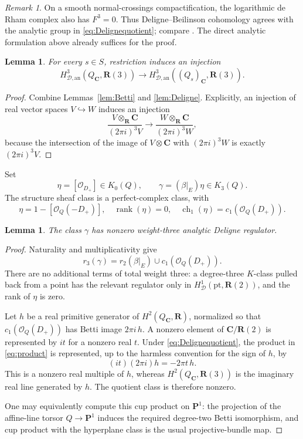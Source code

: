 \documentclass[11pt,a4paper]{article}
\newtheorem{lemma}[theorem]{Lemma}
\theoremstyle{remark}
\newtheorem{remark}[theorem]{Remark}
\newcommand{\R}{\mathbf R}
\newcommand{\C}{\mathbf C}
\newcommand{\PP}{\mathbf P}
\newcommand{\OO}{\mathcal O}
\newcommand{\HD}{H_{\mathcal D,\mathrm{an}}}
\begin{document}
\begin{remark}
On a smooth normal-crossings compactification, the logarithmic de Rham complex also has $F^3=0$. Thus Deligne--Beilinson cohomology agrees with the analytic group in \eqref{eq:Delignequotient}; compare \cite[Remark~2.13]{EsnaultViehweg}. The direct analytic formulation above already suffices for the proof.
\end{remark}

\begin{lemma}\label{lem:Deligneinject}
For every $s\in S$, restriction induces an injection
\[
\HD^3(Q_{\C},\R(3))\longrightarrow\HD^3((Q_s)_{\C},\R(3)).
\]
\end{lemma}
\begin{proof}
Combine Lemmas~\ref{lem:Betti} and \ref{lem:Deligne}. Explicitly, an injection of real vector spaces $V\hookrightarrow W$ induces an injection
\[
\frac{V\otimes_{\R}\C}{(2\pi i)^3V}
\longrightarrow
\frac{W\otimes_{\R}\C}{(2\pi i)^3W},
\]
because the intersection of the image of $V\otimes\C$ with $(2\pi i)^3W$ is exactly $(2\pi i)^3V$.
\end{proof}

Set
\[
\eta=[\OO_{D_+}]\in K_0(Q),\qquad
\gamma=(\beta|_E)\eta\in K_3(Q).
\]
The structure sheaf class is a perfect-complex class, with
\[
\eta=1-[\OO_Q(-D_+)],\quad \operatorname{rank}(\eta)=0,\quad
\operatorname{ch}_1(\eta)=c_1(\OO_Q(D_+)).
\]

\begin{lemma}\label{lem:product}
The class $\gamma$ has nonzero weight-three analytic Deligne regulator.
\end{lemma}
\begin{proof}
Naturality and multiplicativity give
\begin{equation}\label{eq:product}
r_3(\gamma)=r_2(\beta|_E)\cup c_1(\OO_Q(D_+)).
\end{equation}
There are no additional terms of total weight three: a degree-three $K$-class pulled back from a point has the relevant regulator only in $H^1_{\mathcal D}(\mathrm{pt},\R(2))$, and the rank of $\eta$ is zero.

Let $h$ be a real primitive generator of $H^2(Q_{\C},\R)$, normalized so that $c_1(\OO_Q(D_+))$ has Betti image $2\pi i\,h$. A nonzero element of $\C/\R(2)$ is represented by $it$ for a nonzero real $t$. Under \eqref{eq:Delignequotient}, the product in \eqref{eq:product} is represented, up to the harmless convention for the sign of $h$, by
\[
(it)(2\pi i)h=-2\pi t\,h.
\]
This is a nonzero real multiple of $h$, whereas $H^2(Q_{\C},\R(3))$ is the imaginary real line generated by $h$. The quotient class is therefore nonzero.

One may equivalently compute this cup product on $\PP^1$: the projection of the affine-line torsor $Q\to\PP^1$ induces the required degree-two Betti isomorphism, and cup product with the hyperplane class is the usual projective-bundle map.
\end{proof}
\end{document}
